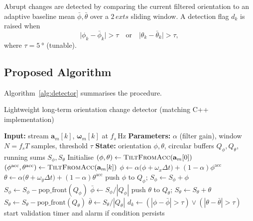 \documentclass{article} %
\begin{document}
Abrupt changes are detected by comparing the current filtered orientation to an adaptive baseline mean $\bar{\phi},\bar{\theta}$ over a $2\,	ext{s}$ sliding window. A detection flag $d_k$ is raised when
\begin{equation}
\lvert\phi_k-\bar{\phi}_k\rvert > \tau \quad \text{or}\quad \lvert\theta_k-\bar{\theta}_k\rvert > \tau,
\end{equation}
where $\tau=\SI{5}{\degree}$ (tunable).

\subsection{Proposed Algorithm}
Algorithm~\ref{alg:detector} summarises the procedure.

\begin{algorithm}[h]
\caption{Lightweight long-term orientation change detector (matching C++ implementation)}\label{alg:detector}
\begin{algorithmic}[1]
\State \textbf{Input:} stream $\mathbf{a}_m[k]$, $\boldsymbol{\omega}_m[k]$ at $f_s$\,Hz
\State \textbf{Parameters:} $\alpha$ (filter gain), window $N\!=\!f_s T$ samples, threshold $\tau$
\State \textbf{State:} orientation $\phi,\theta$, circular buffers $Q_{\phi},Q_{\theta}$, running sums $S_{\phi},S_{\theta}$
\State Initialise $(\phi,\theta) \leftarrow \textsc{TiltFromAcc}(\mathbf{a}_m[0])$ 
    \State $(\phi^{\mathrm{acc}},\theta^{\mathrm{acc}})\gets\textsc{TiltFromAcc}(\mathbf{a}_m[k])$
    \State $\phi\gets\alpha\bigl(\phi+\omega_x\Delta t\bigr)+(1-\alpha)\phi^{\mathrm{acc}}$
    \State $\theta\gets\alpha\bigl(\theta+\omega_y\Delta t\bigr)+(1-\alpha)\theta^{\mathrm{acc}}$
    \State push $\phi$ to $Q_{\phi}$; $S_{\phi}\gets S_{\phi}+\phi$
     $S_{\phi}\gets S_{\phi}-\text{pop\_front}(Q_{\phi})$ \EndIf
    \State $\bar{\phi}\gets S_{\phi}/|Q_{\phi}|$
    \State push $\theta$ to $Q_{\theta}$; $S_{\theta}\gets S_{\theta}+\theta$
     $S_{\theta}\gets S_{\theta}-\text{pop\_front}(Q_{\theta})$ \EndIf
    \State $\bar{\theta}\gets S_{\theta}/|Q_{\theta}|$
    \State $d_k\gets(|\phi-\bar{\phi}|>\tau)\lor(|\theta-\bar{\theta}|>\tau)$
        \State start validation timer and alarm if condition persists
    \EndIf
\EndFor
\end{algorithmic}
\end{algorithm}
\end{document}
